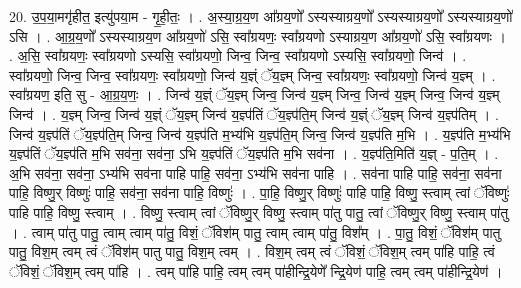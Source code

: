 \documentclass[17pt]{extarticle}
\begin{document}
20. उ॒प॒या॒मगृ॑हीत॒ इत्यु॑पया॒म - गृ॒ही॒तः॒ । . अ॒स्या॒ग्र॒य॒ण आ᳚ग्रय॒णो᳚ ऽस्यस्याग्रय॒णो᳚ ऽस्यस्याग्रय॒णो᳚ ऽस्यस्याग्रय॒णो॑ ऽसि । . आ॒ग्र॒य॒णो᳚ ऽस्यस्याग्रय॒ण आ᳚ग्रय॒णो॑ ऽसि॒ स्वा᳚ग्रयणः॒ स्वा᳚ग्रयणो ऽस्याग्रय॒ण आ᳚ग्रय॒णो॑ ऽसि॒ स्वा᳚ग्रयणः । . अ॒सि॒ स्वा᳚ग्रयणः॒ स्वा᳚ग्रयणो ऽस्यसि॒ स्वा᳚ग्रयणो॒ जिन्व॒ जिन्व॒ स्वा᳚ग्रयणो ऽस्यसि॒ स्वा᳚ग्रयणो॒ जिन्व॑ । . स्वा᳚ग्रयणो॒ जिन्व॒ जिन्व॒ स्वा᳚ग्रयणः॒ स्वा᳚ग्रयणो॒ जिन्व॑ य॒ज्ञ्ं ॅय॒ज्ञ्म् जिन्व॒ स्वा᳚ग्रयणः॒ स्वा᳚ग्रयणो॒ जिन्व॑ य॒ज्ञ्म् । . स्वा᳚ग्रयण॒ इति॒ सु - आ॒ग्र॒य॒णः॒ । . जिन्व॑ य॒ज्ञ्ं ॅय॒ज्ञ्म् जिन्व॒ जिन्व॑ य॒ज्ञ्म् जिन्व॒ जिन्व॑ य॒ज्ञ्म् जिन्व॒ जिन्व॑ य॒ज्ञ्म् जिन्व॑ । . य॒ज्ञ्म् जिन्व॒ जिन्व॑ य॒ज्ञ्ं ॅय॒ज्ञ्म् जिन्व॑ य॒ज्ञ्प॑तिं ॅय॒ज्ञ्प॑ति॒म् जिन्व॑ य॒ज्ञ्ं ॅय॒ज्ञ्म् जिन्व॑ य॒ज्ञ्प॑तिम् । . जिन्व॑ य॒ज्ञ्प॑तिं ॅय॒ज्ञ्प॑ति॒म् जिन्व॒ जिन्व॑ य॒ज्ञ्प॑ति म॒भ्य॑भि य॒ज्ञ्प॑ति॒म् जिन्व॒ जिन्व॑ य॒ज्ञ्प॑ति म॒भि । . य॒ज्ञ्प॑ति म॒भ्य॑भि य॒ज्ञ्प॑तिं ॅय॒ज्ञ्प॑ति म॒भि सव॑ना॒ सव॑ना॒ ऽभि य॒ज्ञ्प॑तिं ॅय॒ज्ञ्प॑ति म॒भि सव॑ना । . य॒ज्ञ्प॑ति॒मिति॑ य॒ज्ञ् - प॒ति॒म् । . अ॒भि सव॑ना॒ सव॑ना॒ ऽभ्य॑भि सव॑ना पाहि पाहि॒ सव॑ना॒ ऽभ्य॑भि सव॑ना पाहि । . सव॑ना पाहि पाहि॒ सव॑ना॒ सव॑ना पाहि॒ विष्णु॒र् विष्णुः॑ पाहि॒ सव॑ना॒ सव॑ना पाहि॒ विष्णुः॑ । . पा॒हि॒ विष्णु॒र् विष्णुः॑ पाहि पाहि॒ विष्णु॒ स्त्वाम् त्वां ॅविष्णुः॑ पाहि पाहि॒ विष्णु॒ स्त्वाम् । . विष्णु॒ स्त्वाम् त्वां ॅविष्णु॒र् विष्णु॒ स्त्वाम् पा॑तु पातु॒ त्वां ॅविष्णु॒र् विष्णु॒ स्त्वाम् पा॑तु । . त्वाम् पा॑तु पातु॒ त्वाम् त्वाम् पा॑तु॒ विशं॒ ॅविश॑म् पातु॒ त्वाम् त्वाम् पा॑तु॒ विश᳚म् । . पा॒तु॒ विशं॒ ॅविश॑म् पातु पातु॒ विश॒म् त्वम् त्वं ॅविश॑म् पातु पातु॒ विश॒म् त्वम् । . विश॒म् त्वम् त्वं ॅविशं॒ ॅविश॒म् त्वम् पा॑हि पाहि॒ त्वं ॅविशं॒ ॅविश॒म् त्वम् पा॑हि । . त्वम् पा॑हि पाहि॒ त्वम् त्वम् पा॑हीन्द्रि॒येणे᳚ न्द्रि॒येण॑ पाहि॒ त्वम् त्वम् पा॑हीन्द्रि॒येण॑ । \newline
\end{document}

